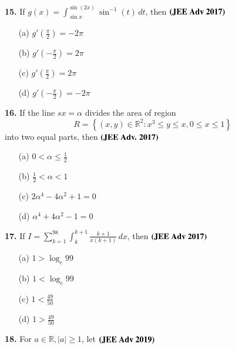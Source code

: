 \documentclass[journal,12pt,twocolumn]{IEEEtran}
\theoremstyle{remark}
\begin{document}
							     \textbf{15.} If $g(x) = \int_{\sin x}^{\sin(2x)} \sin^{-1}(t) \, dt$, then
							     $\hfill \textbf{(JEE Adv 2017)}$
							     \begin{multicols}{2}
							     \begin{itemize}
							         \item[(a)] $g'\left(\frac{\pi}{2}\right) = -2\pi$
								     \item[(b)] $g'\left(-\frac{\pi}{2}\right) = 2\pi$
								         \item[(c)] $g'\left(\frac{\pi}{2}\right) = 2\pi$
									     \item[(d)] $g'\left(-\frac{\pi}{2}\right) = -2\pi$
									     \end{itemize}
									     \end{multicols}
									     \textbf{16.} If the line $sx = \alpha$ divides the area of region
									     \[
									     R = \left\{(x, y) \in \mathbb{R}^2 : x^3 \leq y \leq x, 0 \leq x \leq 1\right\}
									     \]
									     into two equal parts, then $\hfill \textbf{(JEE Adv. 2017)}$
									     \begin{multicols}{2}
									     \begin{itemize}
									         \item[(a)] $0 < \alpha \leq \frac{1}{2}$
										     \item[(b)] $\frac{1}{2} < \alpha < 1$
										         \item[(c)] $2\alpha^4 - 4\alpha^2 + 1 = 0$
											     \item[(d)] $\alpha^4 + 4\alpha^2 - 1 = 0$
											     \end{itemize}
											     \end{multicols}
											     \textbf{17.} If $I = \sum_{k=1}^{98} \int_{k}^{k+1} \frac{k+1}{x(k+1)} \, dx$, then $\hfill \textbf{(JEE Adv 2017)}$
											     \begin{multicols}{2}
											     \begin{itemize}
											         \item[(a)] $1 > \log_e 99$  \item[(b)] $1 < \log_e 99$
												     \item[(c)] $1 < \frac{49}{50}$  \item[(d)] $1 > \frac{49}{50}$
												     \end{itemize}
												     \end{multicols}
												     \textbf{18.} For \(a \in \mathbb{R}, |a| \geq 1\), let $\hfill \textbf{(JEE Adv 2019)}$
\end{document}
